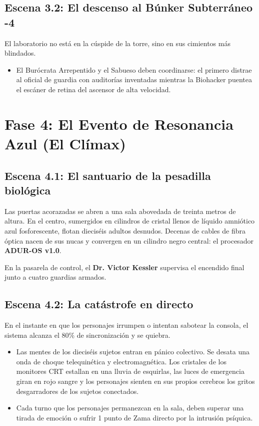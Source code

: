 \subsection{Escena 3.2: El descenso al Búnker Subterráneo -4}
El laboratorio no está en la cúspide de la torre, sino en sus cimientos más blindados.
\begin{itemize}
  \item {} El Burócrata Arrepentido y el Sabueso deben coordinarse: el primero distrae al oficial de guardia con auditorías inventadas mientras la Biohacker puentea el escáner de retina del ascensor de alta velocidad.
\end{itemize}

\section{Fase 4: El Evento de Resonancia Azul (El Clímax)}


\subsection{Escena 4.1: El santuario de la pesadilla biológica}
Las puertas acorazadas se abren a una sala abovedada de treinta metros de altura. En el centro, sumergidos en cilindros de cristal llenos de líquido amniótico azul fosforescente, flotan dieciséis adultos desnudos. Decenas de cables de fibra óptica nacen de sus nucas y convergen en un cilindro negro central: el procesador \textbf{ADUR-OS v1.0}.

En la pasarela de control, el \textbf{Dr. Victor Kessler} supervisa el encendido final junto a cuatro guardias armados.

\subsection{Escena 4.2: La catástrofe en directo}
En el instante en que los personajes irrumpen o intentan sabotear la consola, el sistema alcanza el 80\% de sincronización y se quiebra.
\begin{itemize}
  \item {} Las mentes de los dieciséis sujetos entran en pánico colectivo. Se desata una onda de choque telequinética y electromagnética. Los cristales de los monitores CRT estallan en una lluvia de esquirlas, las luces de emergencia giran en rojo sangre y los personajes sienten en sus propios cerebros los gritos desgarradores de los sujetos conectados.
  \item {} Cada turno que los personajes permanezcan en la sala, deben superar una tirada de emoción o sufrir 1 punto de Zama directo por la intrusión psíquica.
\end{itemize}

